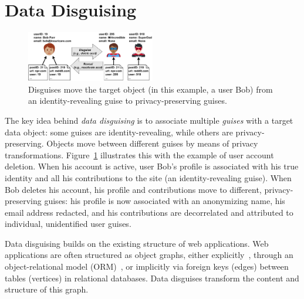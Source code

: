 \section{Data Disguising}
\begin{figure}[t!]
    \centering
    \includegraphics[width=0.5\textwidth]{img/disguises}

    \caption{Disguises move the target object (in this example, a user Bob) from an identity-revealing
    guise to privacy-preserving guises.}
    \label{fig:example}
\end{figure}


%
The key idea behind \emph{data disguising} is to associate multiple \emph{guises} with a target
data object: some guises are identity-revealing, while others are privacy-preserving.
%
Objects move between different guises by means of privacy transformations.
%
Figure~\ref{fig:example} illustrates this with the example of user account deletion.
%
When his account is active, user Bob's profile is associated with his true identity and all his
contributions to the site (an identity-revealing guise).
%
When Bob deletes his account, his profile and contributions move to different,
privacy-preserving guises: his profile is now associated with an anonymizing name, his email
address redacted, and his contributions are decorrelated and attributed to individual,
unidentified user guises.
%

%
Data disguising builds on the existing structure of web applications.
%
Web applications are often structured as object graphs, either explicitly~\cite{tao, delf},
through an object-relational model (ORM)~\cite{orm}, or implicitly via foreign keys (edges)
between tables (vertices) in relational databases.
%
Data disguises transform the content and structure of this graph.
%


